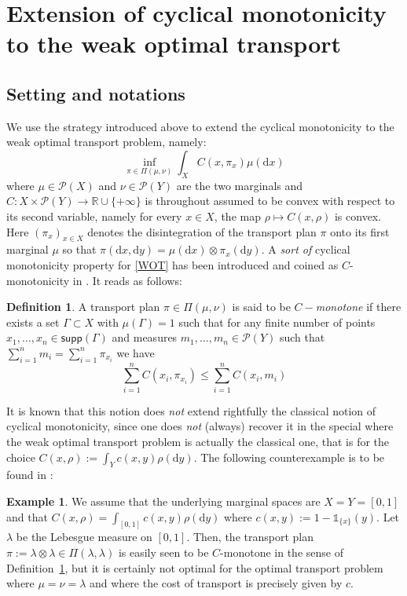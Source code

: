 \documentclass[leqno, 11pt, a4paper]{amsart}
\theoremstyle{definition}
\newtheorem{defi}{Definition}
\newtheorem{ex}{Example}
\newcommand{\R}{\mathbb{R}}
\newcommand{\cP}{\mathcal{P}}
\newcommand{\supp}{\textsf{supp}}
\newcommand{\dd}{\mathrm{d}}
\newcommand{\extendedR}{\R \cup \{+\infty\}}
\begin{document}
\section{Extension of cyclical monotonicity to the weak optimal transport} \label{sec:WOT}
\subsection{Setting and notations}
We use the strategy introduced above to extend the cyclical monotonicity to the weak optimal transport problem, namely:
\begin{equation}\label{WOT}\tag{WOT}
	\inf_{\pi \in \Pi(\mu, \nu)} \int_{X} C(x, \pi_x) \mu(\dd x)
\end{equation}
where $\mu \in \cP(X)$ and $\nu \in \cP(Y)$ are the two marginals and $C : X \times \cP(Y) \to \extendedR$ is throughout assumed to be convex with respect to its second variable, namely for every $x\in X$, the map $\rho \mapsto C(x, \rho)$ is convex. Here $(\pi_x)_{x \in X}$ denotes the disintegration of the transport plan $\pi$ onto its first marginal $\mu$ so that $\pi(\dd x, \dd y) = \mu(\dd x) \otimes \pi_x(\dd y)$. A \textit{sort of} cyclical monotonicity property for \eqref{WOT} has been introduced and coined as $C$-monotonicity in \cite{backhoff-veraguasExistenceDualityCyclical2019}. It reads as follows:
\begin{defi}\label{def:C-mon}
	A transport plan $\pi \in \Pi(\mu, \nu)$ is said to be \textit{$C-$monotone} if there exists a set $\Gamma \subset X$ with $\mu(\Gamma) = 1$ such that for any finite number of points $x_1, \dots, x_n \in \supp(\Gamma)$ and measures $m_1, \dots, m_n \in \cP(Y)$ such that $\sum_{i =1}^n m_i = \sum_{i = 1}^n \pi_{x_i}$ we have 
	\begin{equation}
		\sum_{i = 1}^n C(x_i, \pi_{x_i}) \leq \sum_{i = 1}^n C(x_i, m_i)
	\end{equation}
\end{defi}
It is known that this notion does \textit{not} extend rightfully the classical notion of cyclical monotonicity, since one does \textit{not} (always) recover it in the special where the weak optimal transport problem is actually the classical one, that is for the choice $C(x, \rho) := \int_{Y} c(x, y) \rho(\dd y)$. The following counterexample is to be found in \cite[Example 5.3]{backhoff-veraguasStabilityMartingaleOptimal2022}:
\begin{ex}\label{ex:c-mon-limitation}
	We assume that the underlying marginal spaces are $X = Y = [0,1]$ and that $C(x, \rho) = \int_{[0,1]} c(x, y)\rho(\dd y)$ where $c(x, y) := 1 - \mathds{1}_{\{x\}}(y)$. Let $\lambda$ be the Lebesgue measure on $[0,1]$. Then, the transport plan $\pi := \lambda \otimes \lambda \in \Pi(\lambda, \lambda)$ is easily seen to be $C$-monotone in the sense of Definition~\ref{def:C-mon}, but it is certainly not optimal for the optimal transport problem where $\mu = \nu = \lambda$ and where the cost of transport is precisely given by $c$.
\end{ex}
\end{document}
